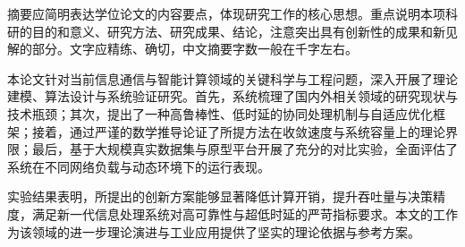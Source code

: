 
\begin{cnabstract}
摘要应简明表达学位论文的内容要点，体现研究工作的核心思想。重点说明本项科研的目的和意义、研究方法、研究成果、结论，注意突出具有创新性的成果和新见解的部分。文字应精练、确切，中文摘要字数一般在千字左右。

本论文针对当前信息通信与智能计算领域的关键科学与工程问题，深入开展了理论建模、算法设计与系统验证研究。首先，系统梳理了国内外相关领域的研究现状与技术瓶颈；其次，提出了一种高鲁棒性、低时延的协同处理机制与自适应优化框架；接着，通过严谨的数学推导论证了所提方法在收敛速度与系统容量上的理论界限；最后，基于大规模真实数据集与原型平台开展了充分的对比实验，全面评估了系统在不同网络负载与动态环境下的运行表现。

实验结果表明，所提出的创新方案能够显著降低计算开销，提升吞吐量与决策精度，满足新一代信息处理系统对高可靠性与超低时延的严苛指标要求。本文的工作为该领域的进一步理论演进与工业应用提供了坚实的理论依据与参考方案。

\end{cnabstract}
